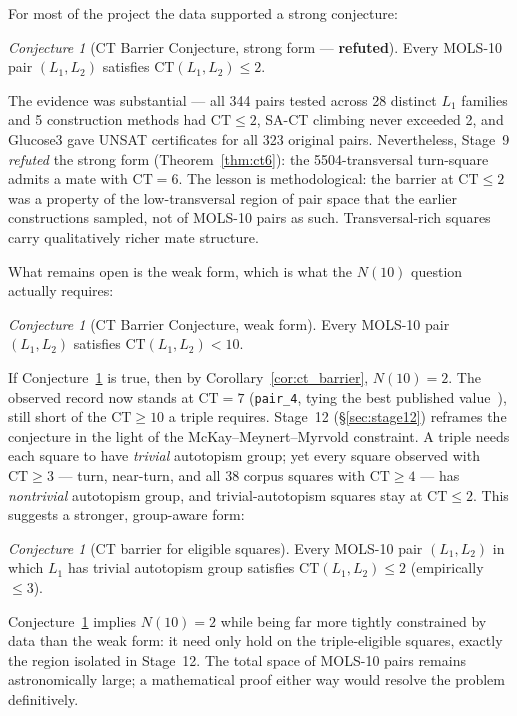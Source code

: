 \documentclass[11pt,a4paper]{article}
\theoremstyle{remark}
\newtheorem{conjecture}[theorem]{Conjecture}
\newcommand{\CT}{\mathrm{CT}}
\begin{document}
For most of the project the data supported a strong conjecture:

\begin{conjecture}[CT Barrier Conjecture, strong form --- \textbf{refuted}]\label{conj:ct}
Every MOLS-10 pair $(L_1, L_2)$ satisfies $\CT(L_1, L_2) \leq 2$.
\end{conjecture}

The evidence was substantial --- all 344 pairs tested across 28 distinct $L_1$
families and 5 construction methods had $\CT \leq 2$, SA-CT climbing never
exceeded 2, and Glucose3 gave UNSAT certificates for all 323 original pairs.
Nevertheless, Stage~9 \emph{refuted} the strong form
(Theorem~\ref{thm:ct6}): the 5504-transversal turn-square admits a mate with
$\CT = 6$. The lesson is methodological: the barrier at $\CT \leq 2$ was a
property of the low-transversal region of pair space that the earlier
constructions sampled, not of MOLS-10 pairs as such. Transversal-rich squares
carry qualitatively richer mate structure.

What remains open is the weak form, which is what the $N(10)$ question
actually requires:

\begin{conjecture}[CT Barrier Conjecture, weak form]\label{conj:ctweak}
Every MOLS-10 pair $(L_1, L_2)$ satisfies $\CT(L_1, L_2) < 10$.
\end{conjecture}

If Conjecture~\ref{conj:ctweak} is true, then by Corollary~\ref{cor:ct_barrier},
$N(10) = 2$. The observed record now stands at $\CT = 7$ (\texttt{pair\_4},
tying the best published value~\cite{bright2022}), still short of the $\CT\geq10$
a triple requires. Stage~12 (\S\ref{sec:stage12}) reframes the conjecture in
the light of the McKay--Meynert--Myrvold constraint. A triple needs each square
to have \emph{trivial} autotopism group; yet every square observed with
$\CT\geq3$ --- turn, near-turn, and all 38 corpus squares with $\CT\geq4$ ---
has \emph{nontrivial} autotopism group, and trivial-autotopism squares stay at
$\CT\leq2$. This suggests a stronger, group-aware form:

\begin{conjecture}[CT barrier for eligible squares]\label{conj:cteligible}
Every MOLS-10 pair $(L_1,L_2)$ in which $L_1$ has trivial autotopism group
satisfies $\CT(L_1,L_2) \leq 2$ (empirically $\leq 3$).
\end{conjecture}

Conjecture~\ref{conj:cteligible} implies $N(10)=2$ while being far more
tightly constrained by data than the weak form: it need only hold on the
triple-eligible squares, exactly the region isolated in Stage~12. The total
space of MOLS-10 pairs remains astronomically large; a mathematical proof
either way would resolve the problem definitively.
\end{document}
